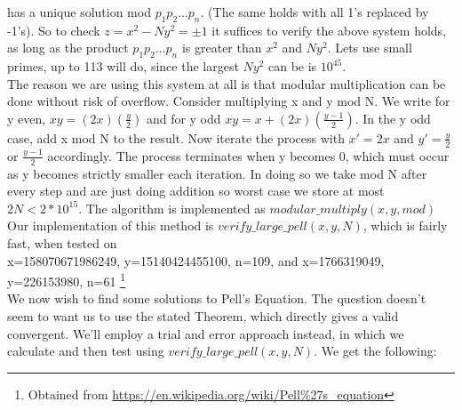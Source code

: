\documentclass[10pt,a4paper]{report}
\begin{document}
has a unique solution mod $p_1p_2\dots p_n$. (The same holds with all 1's replaced by -1's). So to check $z=x^2-Ny^2= \pm 1$ it suffices to verify the above system holds, as long as the product $p_1p_2\dots p_n$ is greater than $x^2$ and $Ny^2$. Lets use small primes, up to 113 will do, since the largest $Ny^2$ can be is $10^{45}$. \\

The reason we are using this system at all is that modular multiplication can be done without risk of overflow. Consider multiplying x and y mod N. We write for y even, $xy = (2x)(\frac{y}{2})$ and for y odd $xy = x+ (2x)(\frac{y-1}{2})$. In the y odd case, add x mod N to the result. Now iterate the process with $x'=2x$ and $y'=\frac{y}{2}$ or $\frac{y-1}{2}$ accordingly. The process terminates when y becomes 0, which must occur as y becomes strictly smaller each iteration. In doing so we take mod N after every step and are just doing addition so worst case we store at most $2N < 2*10^{15}$. The algorithm is implemented as $modular\_multiply(x,y,mod)$\\

Our implementation of this method is $verify\_large\_pell(x,y,N)$, which is fairly fast, when tested on \\ x=158070671986249, y=15140424455100, n=109, and x=1766319049, y=226153980, n=61 \footnote{Obtained from \url{https://en.wikipedia.org/wiki/Pell\%27s_equation}}\\	

We now wish to find some solutions to Pell's Equation. The question doesn't seem to want us to use the stated Theorem, which directly gives a valid convergent. We'll employ a trial and error approach instead, in which we calculate and then test using $verify\_large\_pell(x,y,N)$. We get the following:
\end{document}
